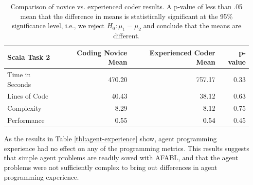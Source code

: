 \begin{center}
\begin{table}[h]
\begin{center}
\begin{tabular}{|l|r|r|r|}\hline
Scala Task 2 & Coding Novice Mean & Experienced Coder Mean & p-value \\\hline
Time in Seconds & 470.20 & 757.17 & 0.33\\
Lines of Code & 40.43 & 38.12 & 0.63\\
Complexity & 8.29 & 8.12 & 0.75\\
Performance & 0.55 & 0.54 & 0.45\\
\hline
\end{tabular}
\end{center}
\caption{Comparison of novice vs. experienced coder results. A p-value of less than .05 mean that the difference in means is statistically significant at the 95\% significance level, i.e., we reject $H_0: \mu_1 = \mu_2$ and conclude that the means are different.}
\label{tbl:code-experience}
\end{table}
\end{center}


As the results in Table \ref{tbl:agent-experience} show, agent programming experience had no effect on any of the programming metrics. This results suggests that simple agent problems are readily soved with AFABL, and that the agent problems were not sufficiently complex to bring out differences in agent programming experience.

